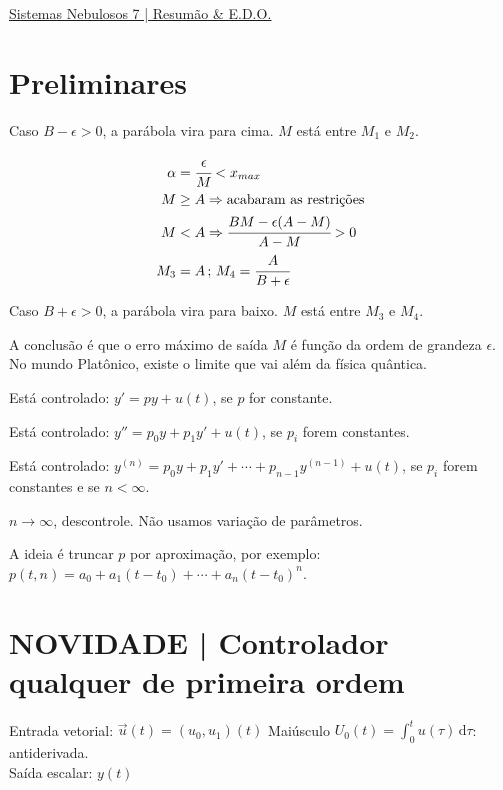 \documentclass[11pt]{article}
\begin{document}
\Large

\begin{center}
\href{https://www.youtube.com/watch?v=BKfWfz4Bah8&list=UUdcL3nma0HpYkWFH52YE06Q}{\color{blue}\underline{Sistemas Nebulosos 7 | Resum\~ao \& E.D.O.}}
\end{center}

\normalsize

\vspace{3mm}

\section{Preliminares}

Caso $B - \epsilon > 0$, a par\'abola vira para cima. $M$ est\'a entre $M_1$ e $M_2$.

\begin{align}
 \alpha &= \cfrac{\epsilon}{M} < x_{max} \\
 M &\ge A \Rightarrow \text{acabaram as restri\c{c}\~oes} \\
 M &< A \Rightarrow \cfrac{BM - \epsilon(A - M)}{A - M} > 0 \\
 M_3 &= A \,;\, M_4 = \cfrac{A}{B + \epsilon}
\end{align}

Caso $B + \epsilon > 0$, a par\'abola vira para baixo. $M$ est\'a entre $M_3$ e $M_4$.

A conclus\~ao \'e que o erro m\'aximo de sa\'ida $M$ \'e fun\c{c}\~ao da ordem de grandeza $\epsilon$. No mundo Plat\^onico, existe o limite que vai al\'em da f\'isica qu\^antica.

Est\'a controlado: $y' = py + u(t)$, se $p$ for constante.

Est\'a controlado: $y'' = p_0 y + p_1 y' + u(t)$, se $p_i$ forem constantes.

Est\'a controlado: $y^{(n)} = p_0 y + p_1 y' + \cdots + p_{n-1} y^{(n-1)} + u(t)$, se $p_i$ forem constantes e se $n < \infty$.

$n \to \infty$, descontrole. N\~ao usamos varia\c{c}\~ao de par\^ametros.

A ideia \'e truncar $p$ por aproxima\c{c}\~ao, por exemplo: $p(t, n) = a_0 + a_1 (t - t_0) + \cdots + a_n (t - t_0)^n$.

\section{NOVIDADE | Controlador qualquer de primeira ordem}

\begin{flushleft}
Entrada vetorial: $\vec u(t) = (u_0,u_1)(t)$ Mai\'usculo $U_0(t) = \int_0^t u(\tau) \,\mathrm{d}\tau$: antiderivada. \\
Sa\'ida escalar: $y(t)$
\end{flushleft}
\end{document}
